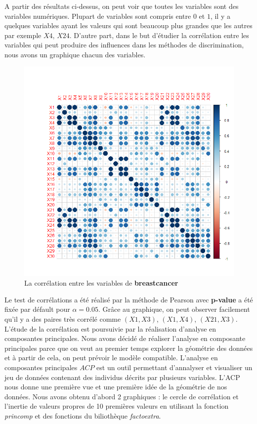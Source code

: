 \documentclass[a4paper,11pt,oneside,roman]{article}
\begin{document}
A partir des résultats ci-dessus, on peut voir que toutes les variables sont des variables numériques. Plupart de variables sont compris entre $0$ et $1$, il y a quelques variables ayant les valeurs qui sont beaucoup plus grandes que les autres par exemple $X4$, $X24$. D'autre part, dans le but d'étudier la corrélation entre les variables qui peut produire des influences dans les méthodes de discrimination, nous avons un graphique chacun des variables. \newline
\begin{figure}[htb]
    \centering
    \includegraphics[scale = .4]{./discrimination/breastcancer/correlation.png} 
    \caption{La corrélation entre les variables de \textbf{breastcancer}}
    \label{fig:my_label}
\end{figure}
Le test de corrélations a été réalisé par la méthode de Pearson avec \textbf{p-value} a été fixée par défault pour $\alpha = 0.05$. Grâce au graphique, on peut observer facilement qu'il y a des paires très corrélé  comme $(X1,X3)$, $(X1,X4)$, $(X21,X3)$. L'étude de la corrélation est poursuivie par la réalisation d'analyse en composantes principales. Nous avons décidé de réaliser l'analyse en composante principales parce que on veut au premier temps explorer la géométrie des données et à partir de cela, on peut prévoir le modèle compatible. 
L'analyse en composantes principales \(ACP\) est un outil permettant d'annalyser et visualiser un jeu de données contenant des individus décrits par plusieurs variables. L'ACP nous donne une première vue et une première idée de la géométrie de nos données. Nous avons obtenu d'abord 2 graphiques : le cercle de corrélation et l'inertie de valeurs propres de 10 premières valeurs en utilisant la fonction \textit{princomp} et des fonctions du biliothèque \textit{factoextra}.
\end{document}
